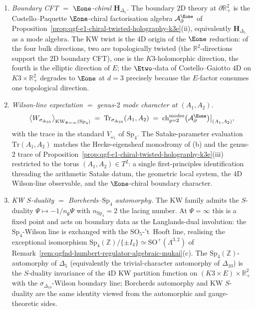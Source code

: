 \begin{proposition}
\begin{enumerate}
 \item[\textup{(i)}] \emph{Boundary CFT $=$ $\Eone$-chiral $\mathbf H_{\Delta_5}$.}
 The boundary $2$D theory at $\partial\mathbb R_+^2$ is the
 Costello--Paquette $\Eone$-chiral factorisation algebra
 $\mathcal A^{\Eone}_\partial$ of
 Proposition~\ref{prop:qgf-e1-chiral-twisted-holography-k3e}(ii),
 equivalently $\mathbf H_{\Delta_5}$ as a mode algebra. The KW twist
 is the $4$D origin of the $\Eone$ reduction: of the four bulk
 directions, two are topologically twisted (the $\mathbb R^2$-directions
 support the $2$D boundary CFT), one is the $K3$-holomorphic direction,
 the fourth is the elliptic direction of $E$; the $\Etwo$-data of
 Costello--Gaiotto $4$D on $K3\times\mathbb R_+^2$ degrades to $\Eone$
 at $d=3$ precisely because the $E$-factor consumes one topological
 direction.
 \item[\textup{(ii)}] \emph{Wilson-line expectation $=$ genus-$2$ mode
 character at $(A_1,A_2)$.}
 \[
 \bigl\langle W_{\sigma_{\Delta_{10}}}\bigr\rangle_{\mathrm{KW}_{\Psi=\infty}(\mathrm{Sp}_4)}
 \;=\;\mathrm{Tr}_{\sigma_{\Delta_{10}}}(A_1,A_2)
 \;=\;\mathrm{ch}^{\mathrm{modes}}_{g=2}\bigl(\mathcal A^{\Eone}_\partial\bigr)\bigr|_{(A_1,A_2)},
 \]
 with the trace in the standard $V_{\omega_1}$ of $\mathrm{Sp}_4$.
 The Satake-parameter evaluation $\mathrm{Tr}(A_1,A_2)$ matches the
 Hecke-eigensheaf monodromy of (b) and the genus-$2$ trace of
 Proposition~\ref{prop:qgf-e1-chiral-twisted-holography-k3e}(iii)
 restricted to the torus $(A_1,A_2)\in T^2$: a single first-principles
 identification threading the arithmetic Satake datum, the geometric
 local system, the $4$D Wilson-line observable, and the $\Eone$-chiral
 boundary character.
 \item[\textup{(iii)}] \emph{KW $S$-duality $=$ Borcherds--$\mathrm{Sp}_4$
 automorphy.} The KW family admits the $S$-duality
 $\Psi\mapsto-1/n_{\mathfrak g}\Psi$ with
 $n_{\mathrm{Sp}_4}=2$ the lacing number. At $\Psi=\infty$ this is a
 fixed point and acts on boundary data as the Langlands-dual
 involution: the $\mathrm{Sp}_4$-Wilson line is exchanged with the
 $\mathrm{SO}_5$-'t~Hooft line, realising the exceptional isomorphism
 $\mathrm{Sp}_4(\mathbb Z)/\{\pm I_4\}\simeq\mathrm{SO}^+(\Lambda^{3,2})$
 of Remark~\ref{rem:qgfnd-humbert-regulator-algebraic-mukai}(c). The
 $\mathrm{Sp}_4(\mathbb Z)$-automorphy of $\Delta_5$ (equivalently the
 trivial-character automorphy of $\Delta_{10}$) is the $S$-duality
 invariance of the $4$D KW partition function on
 $(K3\times E)\times\mathbb R_+^2$ with the
 $\sigma_{\Delta_{10}}$-Wilson boundary line; Borcherds automorphy
 and KW $S$-duality are the same identity viewed from the
 automorphic and gauge-theoretic sides.
\end{enumerate}


\end{proposition}
